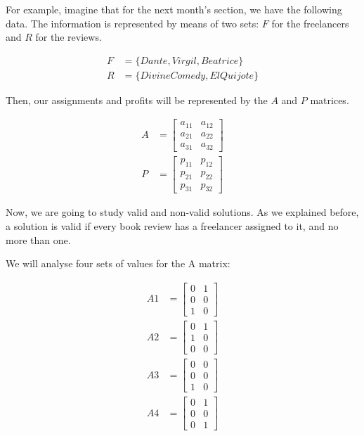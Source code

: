 For example, imagine that for the next month's section, we have the following data. The information is represented by means of two sets: $F$ for the freelancers and $R$ for the reviews.

\begin{align}
    F &= \{ Dante, Virgil, Beatrice \} \\
    R &= \{ Divine Comedy, El Quijote \}
\end{align}

Then, our assignments and profits will be represented by the $A$ and $P$ matrices.

\begin{align}
    A &= 
    \begin{bmatrix}
        a_{11} & a_{12}\\ 
        a_{21} & a_{22}\\ 
        a_{31} & a_{32} 
    \end{bmatrix} \\
    P &= 
    \begin{bmatrix}
        p_{11} & p_{12}\\ 
        p_{21} & p_{22}\\ 
        p_{31} & p_{32} 
    \end{bmatrix}
\end{align}

Now, we are going to study valid and non-valid solutions. As we explained before, a solution is valid if every book review has a freelancer assigned to it, and no more than one.

We will analyse four sets of values for the A matrix:

\begin{align}
    A1 &= 
    \begin{bmatrix}
        0 & 1\\ 
        0 & 0\\ 
        1 & 0 
    \end{bmatrix} \\
    A2 &= 
    \begin{bmatrix}
        0 & 1\\ 
        1 & 0\\ 
        0 & 0 
    \end{bmatrix} \\
    A3 &= 
    \begin{bmatrix}
        0 & 0\\ 
        0 & 0\\ 
        1 & 0 
    \end{bmatrix} \\
    A4 &= 
    \begin{bmatrix}
        0 & 1\\ 
        0 & 0\\ 
        0 & 1 
    \end{bmatrix}
\end{align}

